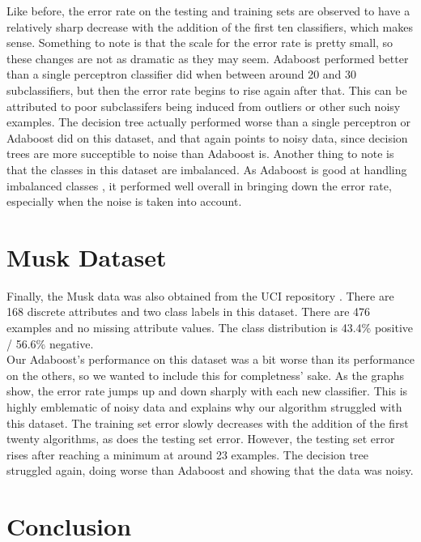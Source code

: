 \documentclass{article}
\begin{document}
Like before, the error rate on the testing and training sets are observed to have a relatively sharp decrease with the addition of the first ten classifiers, which makes sense. Something to note is that the scale for the error rate is pretty small, so these changes are not as dramatic as they may seem. Adaboost performed better than a single perceptron classifier did when between around 20 and 30 subclassifiers, but then the error rate begins to rise again after that. This can be attributed to poor subclassifers being induced from outliers or other such noisy examples. The decision tree actually performed worse than a single perceptron or Adaboost did on this dataset, and that again points to noisy data, since decision trees are more succeptible to noise than Adaboost is. Another thing to note is that the classes in this dataset are imbalanced. As Adaboost is good at handling imbalanced classes \cite{sun-kamel-wang}, it performed well overall in bringing down the error rate, especially when the noise is taken into account.

\section{Musk Dataset}

Finally, the Musk data was also obtained from the UCI repository \cite{musk}. There are 168 discrete attributes and two class labels in this dataset. There are 476 examples and no missing attribute values. The class distribution is 43.4\% positive / 56.6\% negative. \\

Our Adaboost's performance on this dataset was a bit worse than its performance on the others, so we wanted to include this for completness' sake. As the graphs show, the error rate jumps up and down sharply with each new classifier. This is highly emblematic of noisy data and explains why our algorithm struggled with this dataset. The training set error slowly  decreases with the addition of the first twenty algorithms, as does the testing set error. However, the testing set error rises after reaching a minimum at around 23 examples. The decision tree struggled again, doing worse than Adaboost and showing that the data was noisy.

\section{Conclusion}
\end{document}
